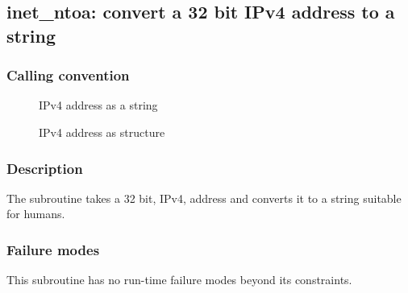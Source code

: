 \clearpage
{}
{}
\label{subr:inet-ntoa}
\subsection*{inet\_ntoa: convert a 32 bit IPv4 address to a string}

\subsubsection*{Calling convention}

\begin{description}
\item[] IPv4 address as a string
\item[] IPv4 address as structure
\end{description}

\subsubsection*{Description}

The  subroutine takes a 32 bit, IPv4, address
and converts it to a string suitable for humans.

\subsubsection*{Failure modes}

This subroutine has no run-time failure modes beyond its constraints.
